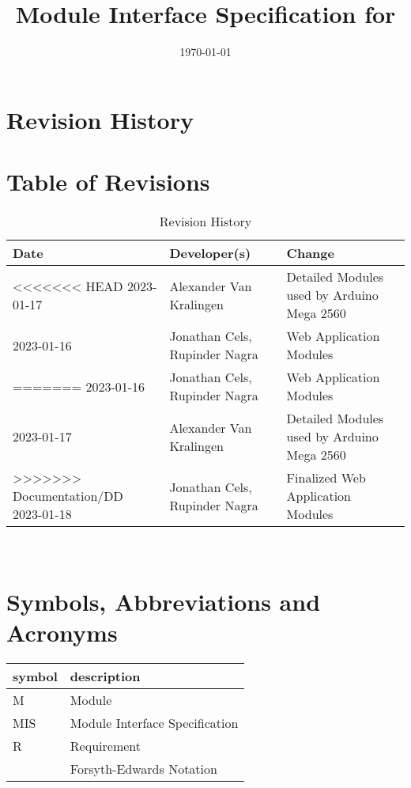 \documentclass[12pt, titlepage]{article}
\begin{document}
\title{Module Interface Specification for \progname{}}

\author{\authname}

\date{\today}

\maketitle


\section{Revision History}

\section*{Table of Revisions}
\begin{table}[hp]
\caption{Revision History} \label{TblRevisionHistory}
\begin{tabularx}{\textwidth}{llX}
\toprule
\textbf{Date} & \textbf{Developer(s)} & \textbf{Change}\\
\midrule
<<<<<<< HEAD
2023-01-17 & Alexander Van Kralingen & Detailed Modules used by Arduino Mega 2560\\
2023-01-16 & Jonathan Cels, Rupinder Nagra & Web Application Modules\\
=======
2023-01-16 & Jonathan Cels, Rupinder Nagra & Web Application Modules\\
2023-01-17 & Alexander Van Kralingen & Detailed Modules used by Arduino Mega 2560\\
>>>>>>> Documentation/DD
2023-01-18 & Jonathan Cels, Rupinder Nagra & Finalized Web Application Modules\\
\bottomrule
\end{tabularx}
\end{table}

~\newpage

\section{Symbols, Abbreviations and Acronyms}

\renewcommand{\arraystretch}{1.2}
\begin{tabular}{l l} 
  \toprule		
  \textbf{symbol} & \textbf{description}\\
  \midrule 
  M & Module \\
  MIS & Module Interface Specification \\
  R & Requirement\\
  \cite{FEN} & Forsyth-Edwards Notation\\
  \bottomrule
\end{tabular}\\
\end{document}
